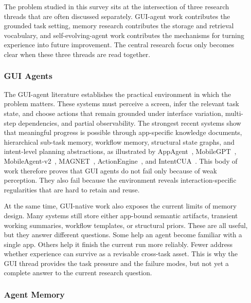 \documentclass{article}
\begin{document}
The problem studied in this survey sits at the intersection of three
research threads that are often discussed separately. GUI-agent work
contributes the grounded task setting, memory research contributes the
storage and retrieval vocabulary, and self-evolving-agent work
contributes the mechanisms for turning experience into future
improvement. The central research focus only becomes clear when these
three threads are read together.

\subsubsection{GUI Agents}\label{311-gui-agents}

The GUI-agent literature establishes the practical environment in which
the problem matters. These systems must perceive a screen, infer the
relevant task state, and choose actions that remain grounded under
interface variation, multi-step dependencies, and partial observability.
The strongest recent systems show that meaningful progress is possible
through app-specific knowledge documents, hierarchical sub-task memory,
workflow memory, structural state graphs, and intent-level planning
abstractions, as illustrated by AppAgent~\parencite{zhang2023appagentmultimodalagentssmartphone},
MobileGPT~\parencite{lee2024exploreselectderiverecall},
MobileAgent-v2~\parencite{wang2024mobileagentv2mobiledeviceoperation},
MAGNET~\parencite{sun2026magnetadaptiveguiagents},
ActionEngine~\parencite{zhong2026actionenginereactiveprogrammaticgui}, and
IntentCUA~\parencite{lee2026intentcualearningintentlevelrepresentations}. This body of work therefore
proves that GUI agents do not fail only because of weak perception.
They also fail because the environment reveals interaction-specific
regularities that are hard to retain and reuse.

At the same time, GUI-native work also exposes the current limits of
memory design. Many systems still store either app-bound semantic
artifacts, transient working summaries, workflow templates, or
structural priors. These are all useful, but they answer different
questions. Some help an agent become familiar with a single app. Others
help it finish the current run more reliably. Fewer address whether
experience can survive as a revisable cross-task asset. This is why the
GUI thread provides the task pressure and the failure modes, but not yet
a complete answer to the current research question.

\subsubsection{Agent Memory}\label{312-agent-memory}
\end{document}
